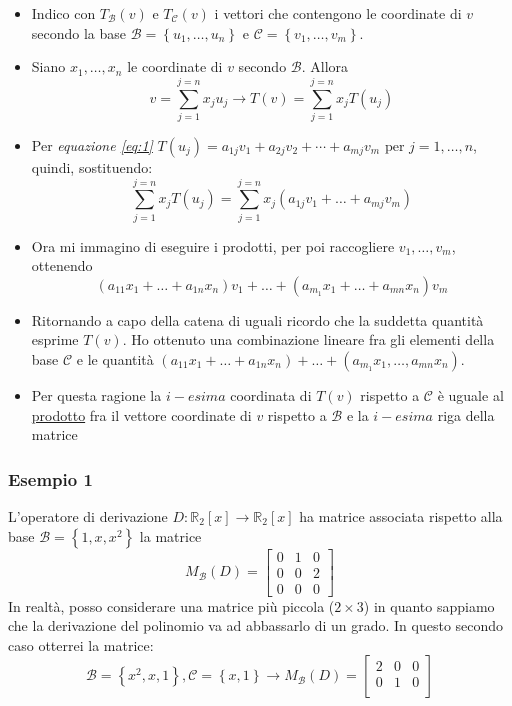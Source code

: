 \begin{itemize}
	\item Indico con $ T_\mathcal{B}\left( v \right)  $ e $ T_\mathcal{C}\left( v \right)  $ i vettori che contengono le coordinate di $ v $ secondo la base $ \mathcal{B} = \left\{ u_1,\ldots,u_n \right\} $ e $ \mathcal{C} = \left\{ v_1,\ldots,v_m \right\} $.
	\item Siano $ x_1,\ldots,x_n $ le coordinate di $ v $ secondo $ \mathcal{B} $. Allora
	      \[
		      v= \sum_{j=1}^{j=n} x_ju_j \rightarrow T\left( v \right) = \sum_{j=1}^{j=n} x_j T\left( u_j \right)
	      \]
	\item Per \textit{equazione \ref{eq:1}} $ T\left(u_j\right)=a_{1 j} v_1+a_{2 j} v_2+\cdots+a_{m j} v_m \text{ per } j=1, \ldots, n $, quindi, sostituendo:
	      \[
		      \sum_{j=1}^{j=n} x_j T\left( u_j \right)=\sum_{j=1}^{j=n} x_j\left( a_{1j}v_1+\ldots+a_{mj}v_m \right)
	      \]
	\item Ora mi immagino di eseguire i prodotti, per poi raccogliere $ v_1,\ldots,v_m $, ottenendo
	      \[
		      \left( a_{11}x_1 +\ldots + a_{1n}x_n \right)v_1 + \ldots + \left( a_{m_1}x_1 + \ldots + a_{mn}x_n \right) v_m
	      \]
	\item Ritornando a capo della catena di uguali ricordo che la suddetta quantità esprime $ T\left( v \right)  $. Ho ottenuto una combinazione lineare fra gli elementi della base $ \mathcal{C} $ e le quantità 	$\left( a_{11}x_1 +\ldots + a_{1n}x_n \right) + \ldots + \left( a_{m_1}x_1 , \ldots , a_{mn}x_n \right)  $.
	\item Per questa ragione la $ i-esima $ coordinata di $ T\left( v \right)  $ rispetto a $ \mathcal{C} $ è uguale al \underline{prodotto} fra il vettore coordinate di $ v $ rispetto a $ \mathcal{B} $ e la $ i-esima $ riga della matrice
\end{itemize}
\subsubsection*{Esempio 1}
L'operatore di derivazione $D: \mathbb{R}_2[x] \rightarrow \mathbb{R}_2[x]$ ha matrice associata rispetto alla base $\mathcal{B}=\left\{1, x, x^2\right\}$ la matrice
$$
	M_{\mathcal{B}}(D)=\left[\begin{array}{lll}
			0 & 1 & 0 \\
			0 & 0 & 2 \\
			0 & 0 & 0
		\end{array}\right]
$$
In realtà, posso considerare una matrice più piccola ($ 2 \times 3 $) in quanto sappiamo che la derivazione del polinomio va ad abbassarlo di un grado. In questo secondo caso otterrei la matrice:
\[
	\mathcal{B}=\left\{ x^2,x,1 \right\} , \mathcal{C}= \left\{ x,1 \right\}  \rightarrow
	M_{\mathcal{B}}(D)=
	\begin{bmatrix}
		2 & 0 & 0 \\
		0 & 1 & 0 \\
	\end{bmatrix}
\]
